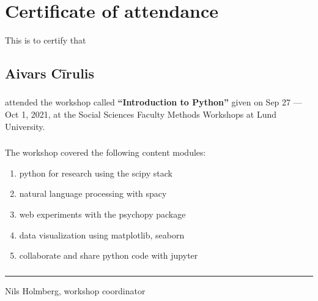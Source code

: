 \hypertarget{certificate-of-attendance}{%
\section{Certificate of attendance}\label{certificate-of-attendance}}

This is to certify that

\hypertarget{aivars-cux12brulis}{%
\subsection{Aivars Cīrulis}\label{aivars-cux12brulis}}

\hypertarget{section}{%
\subsubsection{}\label{section}}

attended the workshop called \textbf{``Introduction to Python''} given
on Sep 27 --- Oct 1, 2021, at the Social Sciences Faculty Methods
Workshops at Lund University.

\hypertarget{section-1}{%
\subsubsection{}\label{section-1}}

The workshop covered the following content modules:

\begin{enumerate}
\def\labelenumi{\arabic{enumi}.}
\tightlist
\item
  python for research using the scipy stack
\item
  natural language processing with spacy
\item
  web experiments with the psychopy package
\item
  data visualization using matplotlib, seaborn
\item
  collaborate and share python code with jupyter
\end{enumerate}

\hypertarget{section-2}{%
\subsubsection{}\label{section-2}}

\hypertarget{section-3}{%
\subsubsection{}\label{section-3}}

\hypertarget{section-4}{%
\subsubsection{}\label{section-4}}

\begin{center}\rule{0.5\linewidth}{0.5pt}\end{center}

Nils Holmberg, workshop coordinator
